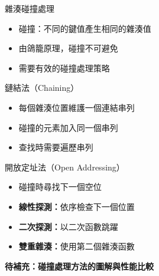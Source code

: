 \documentclass{beamer}
\begin{document}
\begin{frame}{雜湊碰撞處理}
\begin{itemize}
    \item 碰撞：不同的鍵值產生相同的雜湊值
    \item 由鴿籠原理，碰撞不可避免
    \item 需要有效的碰撞處理策略
\end{itemize}

\vspace{1em}
\begin{block}{鏈結法（Chaining）}
\begin{itemize}
    \item 每個雜湊位置維護一個連結串列
    \item 碰撞的元素加入同一個串列
    \item 查找時需要遍歷串列
\end{itemize}
\end{block}

\vspace{1em}
\begin{block}{開放定址法（Open Addressing）}
\begin{itemize}
    \item 碰撞時尋找下一個空位
    \item \textbf{線性探測：}依序檢查下一個位置
    \item \textbf{二次探測：}以二次函數跳躍
    \item \textbf{雙重雜湊：}使用第二個雜湊函數
\end{itemize}
\end{block}

\vspace{1em}
\textbf{待補充：碰撞處理方法的圖解與性能比較}
\end{frame}
\end{document}
